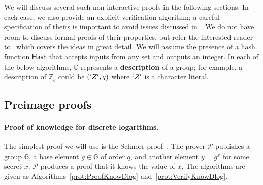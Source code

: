\documentclass[12pt,a4paper]{article}
\theoremstyle{definition}
\begin{document}
We will discuss several such non-interactive proofs in the following sections. In each case, we also provide an explicit verification algorithm; a careful specification of theirs is important to avoid issues discussed in~\cite{mcmurtry2020test}. We do not have room to discuss formal proofs of their properties, but refer the interested reader to~\cite{boneh2020graduate} which covers the ideas in great detail. We will assume the presence of a hash function $\mathsf{Hash}$ that accepts inputs from any set and outputs an integer. In each of the below algorithms, $\mathbb{G}$ represents a \textbf{description} of a group; for example, a description of $\mathbb{Z}_q$ could be $(`Z', q)$ where $`Z'$ is a character literal.

\subsection{Preimage proofs}
\paragraph{Proof of knowledge for discrete logarithms.}
The simplest proof we will use is the Schnorr proof~\cite{schnorr1991efficient}. The prover $\mathcal{P}$ publishes a group $\mathbb{G}$, a base element $g\in\mathbb{G}$ of order $q$, and another element $y = g^x$ for some secret $x$. $\mathcal{P}$ produces a proof that it knows the value of $x$. The algorithms are given as Algorithms~\ref{prot:ProofKnowDlog} and~\ref{prot:VerifyKnowDlog}.
\end{document}
